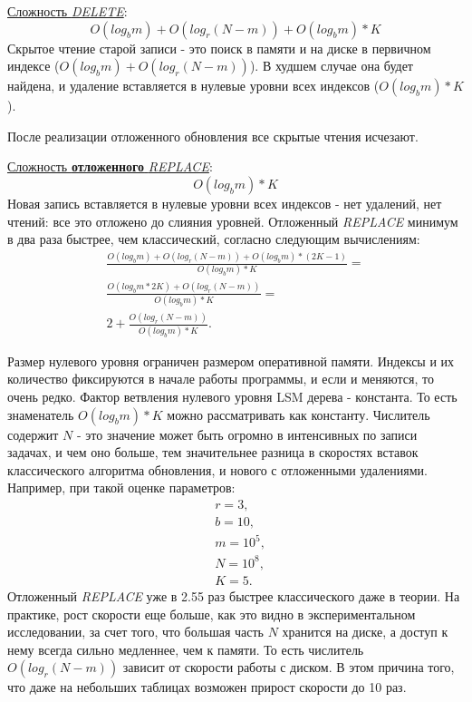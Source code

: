 \documentclass[a4paper,hidelinks,12pt]{article}
\begin{document}
\underline{Сложность \textit{DELETE}}:
\begin{displaymath}
O(log_bm) + O(log_r(N - m)) + O(log_bm) * K
\end{displaymath}
Скрытое чтение старой записи - это поиск в памяти и на диске в первичном
индексе ($O(log_bm) + O(log_r(N - m))$). В худшем случае она будет найдена, и
удаление вставляется в нулевые уровни всех индексов ($O(log_bm) * K$).

После реализации отложенного обновления все скрытые чтения исчезают.

\underline{Сложность \textbf {отложенного} \textit{REPLACE}}:
\begin{displaymath}
O(log_bm) * K
\end{displaymath}
Новая запись вставляется в нулевые уровни всех индексов - нет удалений, нет
чтений: все это отложено до слияния уровней. Отложенный \textit{REPLACE} минимум
в два раза быстрее, чем классический, согласно следующим вычислениям:
\begin{gather*}
\frac{O(log_bm) + O(log_r(N - m)) + O(log_bm) * (2K - 1)}{O(log_bm) * K} = \\
\frac{O(log_bm * 2K) + O(log_r(N - m))}{O(log_bm) * K} = \\
2 + \frac{O(log_r(N - m))}{O(log_bm) * K}.
\end{gather*}

Размер нулевого уровня ограничен размером оперативной памяти. Индексы и их
количество фиксируются в начале работы программы, и если и меняются, то очень
редко. Фактор ветвления нулевого уровня LSM дерева - константа. То есть
знаменатель $O(log_bm) * K$ можно рассматривать как константу. Числитель
содержит $N$ - это значение может быть огромно в интенсивных по записи задачах,
и чем оно больше, тем значительнее разница в скоростях вставок классического
алгоритма обновления, и нового с отложенными удалениями. Например, при такой
оценке параметров:
\begin{align*}
&r = 3, \\
&b = 10, \\
&m = 10^5, \\
&N = 10^8, \\
&K = 5.
\end{align*}
Отложенный \textit{REPLACE} уже в 2.55 раз быстрее классического даже в теории.
На практике, рост скорости еще больше, как это видно в экспериментальном
исследовании, за счет того, что большая часть $N$ хранится на диске, а доступ к
нему всегда сильно медленнее, чем к памяти. То есть числитель $O(log_r(N - m))$
зависит от скорости работы с диском. В этом причина того, что даже на небольших
таблицах возможен прирост скорости до 10 раз.
\end{document}
